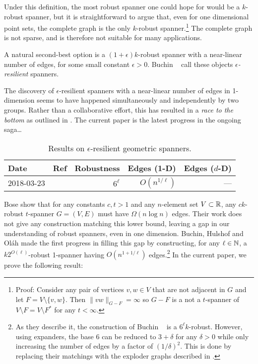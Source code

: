 \documentclass{patmorin}
\begin{document}
Under this definition, the most robust spanner one could hope for
would be a $k$-robust spanner, but it is straightforward to argue
that, even for one dimensional point sets, the complete graph is the
only $k$-robust spanner.\footnote{Proof: Consider any pair of vertices
$v,w\in V$ that are not adjacent in $G$ and let $F=V\setminus\{v,w\}$.
Then $\|vw\|_{G-F}=\infty$ so $G-F$ is a not a $t$-spanner of $V\setminus
F=V\setminus F^*$ for any $t<\infty$.} The complete graph is not sparse,
and is therefore not suitable for many applications.

A natural second-best option is a $(1+\epsilon)k$-robust spanner with
a near-linear number of edges, for some small constant $\epsilon
>0$.  Buchin \etal\ \cite{buchin.har-peled.ea:spanner} call these
objects \emph{$\epsilon$-resilient} spanners.  


The discovery of
$\epsilon$-resilient spanners with a near-linear number of edges in 1-dimension 
seems
to have happened simultaneously and independently by two groups. Rather
than a collaborative effort, this has resulted in a \emph{race to the
bottom} as outlined in .  The current paper is the latest
progress in the ongoing saga\ldots

\begin{table}
   \begin{center}
   \begin{tabular}{|l|l|r|r|r|}
      \hline
      Date & Ref & Robustness & Edges (1-D) & Edges ($d$-D) \\ \hline\hline
      2018-03-23 & \cite{buchin-hushof.ea:robust} &  $6^\ell$ & $O(n^{1/\ell})$ & --- \\
   \hline
   \end{tabular}
   \end{center}
   \caption{Results on $\epsilon$-resilient geometric spanners.}
\end{table}


Bose \etal \cite[Theorem~3]{bose.dujmovic.ea:robust} show that for any
constants $c,t>1$ and any $n$-element set $V\subset\mathbb{R}$, any $ck$-robust
$t$-spanner $G=(V,E)$ must have $\Omega(n\log n)$ edges.  Their work
does not give any construction matching this lower bound, leaving a
gap in our understanding of robust spanners, even in one dimension.
Buchin, Hulshof and Ol\'ah \cite{buchin.hulshof.olah:robust} made the
first progress in filling this gap by constructing, for any $\ell\in\mathbb{N}$,
a $k2^{O(\ell)}$-robust 1-spanner having $O(n^{1+1/\ell})$
edges.\footnote{As they describe it, the construction of Buchin \etal\
\cite{buchin.hulshof.olah:robust} is a $6^\ell k$-robust.  However,
using expanders, the base $6$ can be reduced to $3+\delta$ for
any $\delta >0$ while only increasing the number of edges by a factor
of $(1/\delta)^2$.  This is done by replacing their matchings with the
exploder graphs described in \thmref{exploder}.}  In the current paper,
we prove the following result:
\end{document}
